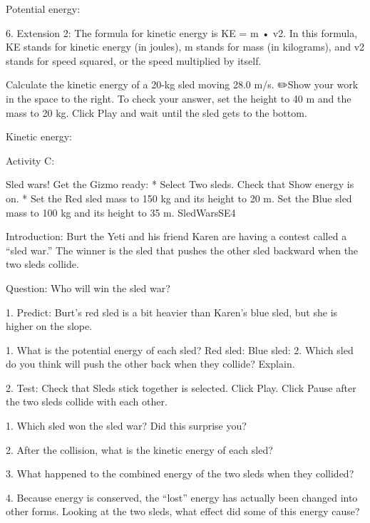 Potential energy: 
	

	            6. Extension 2: The formula for kinetic energy is KE =   m • v2. In this formula, KE stands for kinetic energy (in joules), m stands for mass (in kilograms), and v2 stands for speed squared, or the speed multiplied by itself.   


Calculate the kinetic energy of a 20-kg sled moving 28.0 m/s. ✏️Show your work in the space to the right. To check your answer, set the height to 40 m and the mass to 20 kg. Click Play and wait until the sled gets to the bottom.
         
Kinetic energy:
	

	        




Activity C: 


Sled wars!
	Get the Gizmo ready: 
               * Select Two sleds. Check that Show energy is on.
               * Set the Red sled mass to 150 kg and its height to 20 m. Set the Blue sled mass to 100 kg and its height to 35 m.
	 SledWarsSE4 

	

Introduction: Burt the Yeti and his friend Karen are having a contest called a “sled war.” The winner is the sled that pushes the other sled backward when the two sleds collide.


Question: Who will win the sled war?


               1. Predict: Burt’s red sled is a bit heavier than Karen’s blue sled, but she is higher on the slope. 


               1. What is the potential energy of each sled?
	Red sled:
Blue sled:
	               2. Which sled do you think will push the other back when they collide? Explain.
	

	

               2. Test: Check that Sleds stick together is selected. Click Play. Click Pause after the two sleds collide with each other.


               1. Which sled won the sled war? Did this surprise you? 
	

	               2. After the collision, what is the kinetic energy of each sled? 
	

	               3. What happened to the combined energy of the two sleds when they collided? 
	

	               4. Because energy is conserved, the “lost” energy has actually been changed into other forms. Looking at the two sleds, what effect did some of this energy cause?
	

